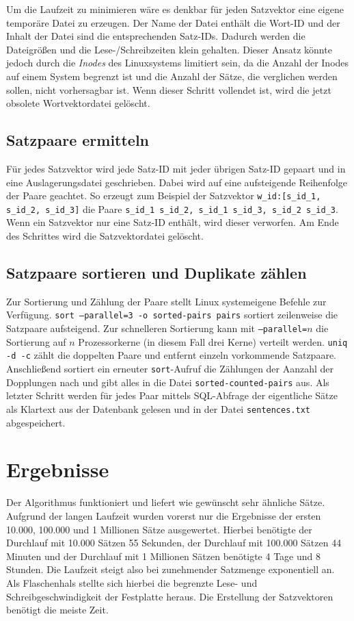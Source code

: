 \documentclass[a4paper,11pt,utf8]{scrartcl}
\begin{document}
Um die Laufzeit zu minimieren wäre es denkbar für jeden Satzvektor eine eigene temporäre Datei zu erzeugen. Der Name der Datei enthält die Wort-ID und der Inhalt der Datei sind die entsprechenden Satz-IDs. Dadurch werden die Dateigrößen und die Lese-/Schreibzeiten klein gehalten. Dieser Ansatz könnte jedoch durch die \emph{Inodes} des Linuxsystems limitiert sein, da die Anzahl der Inodes auf einem System begrenzt ist und die Anzahl der Sätze, die verglichen werden sollen, nicht vorhersagbar ist. Wenn dieser Schritt vollendet ist, wird die jetzt obsolete Wortvektordatei gelöscht.

\subsection{Satzpaare ermitteln}
Für jedes Satzvektor wird jede Satz-ID mit jeder übrigen Satz-ID gepaart und in eine Auslagerungsdatei geschrieben. Dabei wird auf eine aufsteigende Reihenfolge der Paare geachtet. So erzeugt zum Beispiel der Satzvektor \texttt{w\_id:[s\_id\_1, s\_id\_2, s\_id\_3]} die Paare \texttt{s\_id\_1 s\_id\_2, s\_id\_1 s\_id\_3, s\_id\_2 s\_id\_3}. Wenn ein Satzvektor nur eine Satz-ID enthält, wird dieser verworfen. Am Ende des Schrittes wird die Satzvektordatei gelöscht.

\subsection{Satzpaare sortieren und Duplikate zählen}
Zur Sortierung und Zählung der Paare stellt Linux systemeigene Befehle zur Verfügung. \texttt{sort --parallel=3 -o sorted-pairs pairs} sortiert zeilenweise die Satzpaare aufsteigend. Zur schnelleren Sortierung kann mit \texttt{--parallel=$n$} die Sortierung auf $n$ Prozessorkerne (in diesem Fall drei Kerne) verteilt werden. \texttt{uniq -d -c} zählt die doppelten Paare und entfernt einzeln vorkommende Satzpaare. Anschließend sortiert ein erneuter \texttt{sort}-Aufruf die Zählungen der Aanzahl der Dopplungen nach und gibt alles in die Datei \texttt{sorted-counted-pairs} aus. Als letzter Schritt werden für jedes Paar mittels SQL-Abfrage der eigentliche Sätze als Klartext aus der Datenbank gelesen und in der Datei \texttt{sentences.txt} abgespeichert.

\section{Ergebnisse}
Der Algorithmus funktioniert und liefert wie gewünscht sehr ähnliche Sätze. Aufgrund der langen Laufzeit wurden vorerst nur die Ergebnisse der ersten 10.000, 100.000 und 1 Millionen Sätze ausgewertet. Hierbei benötigte der Durchlauf mit 10.000 Sätzen 55 Sekunden, der Durchlauf mit 100.000 Sätzen 44 Minuten und der Durchlauf mit 1 Millionen Sätzen benötigte 4 Tage und 8 Stunden. Die Laufzeit steigt also bei zunehmender Satzmenge exponentiell an. Als Flaschenhals stellte sich hierbei die begrenzte Lese- und Schreibgeschwindigkeit der Festplatte heraus. Die Erstellung der Satzvektoren benötigt die meiste Zeit. 
\end{document}
